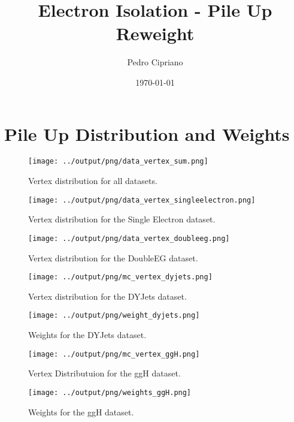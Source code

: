 \documentclass[11pt]{book}
\begin{document}
         
 
 \author{Pedro Cipriano}
 \date{\today}
 \title{Electron Isolation - Pile Up Reweight}

\maketitle

\tableofcontents

\chapter{Pile Up Distribution and Weights}
\begin{figure}[htb]
\centering
\texttt{[image: ../output/png/data\_vertex\_sum.png]}
\caption{Vertex distribution for all datasets.}
\label{fig:data_vertex_sum}
\end{figure}


\begin{figure}[htb]
\centering
\texttt{[image: ../output/png/data\_vertex\_singleelectron.png]}
\caption{Vertex distribution for the Single Electron dataset.}
\label{fig:data_vertex_singleelectron}
\end{figure}

\begin{figure}[htb]
\centering
\texttt{[image: ../output/png/data\_vertex\_doubleeg.png]}
\caption{Vertex distribution for the DoubleEG dataset.}
\label{fig:data_vertex_doubleeg}
\end{figure}

\begin{figure}[htb]
\centering
\texttt{[image: ../output/png/mc\_vertex\_dyjets.png]}
\caption{Vertex distribution for the DYJets dataset.}
\label{fig:mc_vertex_dyjets}
\end{figure}

\begin{figure}[htb]
\centering
\texttt{[image: ../output/png/weight\_dyjets.png]}
\caption{Weights for the DYJets dataset.}
\label{fig:weight_dyjets}
\end{figure}

\begin{figure}[htb]
\centering
\texttt{[image: ../output/png/mc\_vertex\_ggH.png]}
\caption{Vertex Distributuion for the ggH dataset.}
\label{fig:mc_vertex_ggh}
\end{figure}

\begin{figure}[htb]
\centering
\texttt{[image: ../output/png/weights\_ggH.png]}
\caption{Weights for the ggH dataset.}
\label{fig:weight_ggh}
\end{figure}
\end{document}
